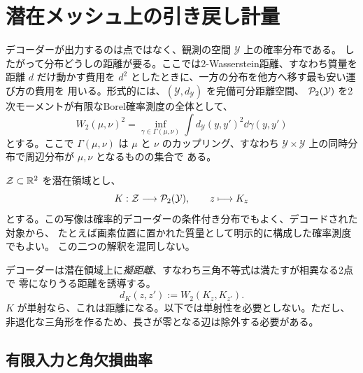 \section{潜在メッシュ上の引き戻し計量}
\label{sec:setup}

デコーダーが出力するのは点ではなく、観測の空間 $\mathcal Y$ 上の確率分布である。
したがって分布どうしの距離が要る。ここでは2-Wasserstein距離、すなわち質量を距離
$d$ だけ動かす費用を $d^2$ としたときに、一方の分布を他方へ移す最も安い運び方の費用を
用いる。形式的には、$(\mathcal Y,d_{\mathcal Y})$ を完備可分距離空間、
$\mathcal{P}_2(\mathcal Y)$ を2次モーメントが有限なBorel確率測度の全体として、
\begin{equation}
 W_2(\mu,\nu)^2
 =\inf_{\gamma\in\Gamma(\mu,\nu)}
 \int d_{\mathcal Y}(y,y')^2\dd\gamma(y,y')
 \label{eq:w2-definition}
\end{equation}
とする。ここで $\Gamma(\mu,\nu)$ は $\mu$ と $\nu$ のカップリング、すなわち
$\mathcal Y\times\mathcal Y$ 上の同時分布で周辺分布が $\mu,\nu$ となるものの集合で
ある\cite{villani2009,peyre2019}。

$\mathcal{Z}\subset\mathbb R^2$ を潜在領域とし、
\begin{equation}
 K:\mathcal{Z}\longrightarrow\mathcal{P}_2(\mathcal Y),\qquad z\longmapsto K_z
 \label{eq:decoder-measure-map}
\end{equation}
とする。この写像は確率的デコーダーの条件付き分布でもよく、デコードされた対象から、
たとえば画素位置に置かれた質量として明示的に構成した確率測度でもよい。
この二つの解釈を混同しない。

デコーダーは潜在領域上に\emph{擬距離}、すなわち三角不等式は満たすが相異なる2点で
零になりうる距離を誘導する。
\begin{equation}
 d_K(z,z'):=W_2(K_z,K_{z'}).
 \label{eq:decoder-pseudometric}
\end{equation}
$K$ が単射なら、これは距離になる。以下では単射性を必要としない。ただし、
非退化な三角形を作るため、長さが零となる辺は除外する必要がある。

\subsection{有限入力と角欠損曲率}
\label{sec:finite-input}

